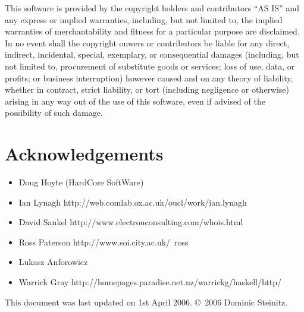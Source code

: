 \documentclass{article}
\begin{document}
\begin{sc}
This software is provided by the copyright holders and contributors ``AS IS'' 
and any express or implied warranties, including, but not limited to, 
the implied warranties of merchantability and fitness for a particular 
purpose are disclaimed. In no event shall the copyright onwers or
contributors be liable for any direct, indirect, incidental, special,
exemplary, or consequential damages (including, but not limited to,
procurement of substitute goods or services; loss of use, data, or profits;
or business interruption) however caused and on any theory of liability,
whether in contract, strict liability, or tort (including negligence or
otherwise) arising in any way out of the use of this software,
even if advised of the possibility of such damage.
\end{sc}

\section{Acknowledgements}

\begin{itemize}
\item
Doug Hoyte (HardCore SoftWare)
\item
\htmladdnormallinkfoot
   {Ian Lynagh}
   {http://web.comlab.ox.ac.uk/oucl/work/ian.lynagh}
\item
\htmladdnormallinkfoot
   {David Sankel}
   {http://www.electronconsulting.com/whois.html}
\item
\htmladdnormallinkfoot 
{Ross Paterson}
{http://www.soi.city.ac.uk/~ross}
\item
Lukasz Anforowicz
\item
\htmladdnormallinkfoot 
{Warrick Gray}
{http://homepages.paradise.net.nz/warrickg/haskell/http/}
\end{itemize}

This document was last updated on 1st April 2006.
\copyright\ 2006 Dominic Steinitz. 
\end{document}
